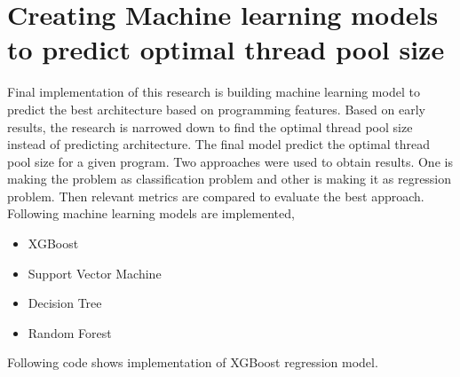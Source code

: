 \section{Creating Machine learning models to predict optimal thread pool size}

Final implementation of this research is building machine learning model to predict the best architecture based on programming features. Based on early results, the research is narrowed down to find the optimal thread pool size instead of predicting architecture. The final model predict the optimal thread pool size for a given program. Two approaches were used to obtain results. One is making the problem as classification problem and other is making it as regression problem. Then relevant metrics are compared to evaluate the best approach. Following machine learning models are implemented,

\begin{itemize}
	
	\item XGBoost
	\item Support Vector Machine
	\item Decision Tree
	\item Random Forest
	
\end{itemize}

Following code shows implementation of XGBoost regression model.

